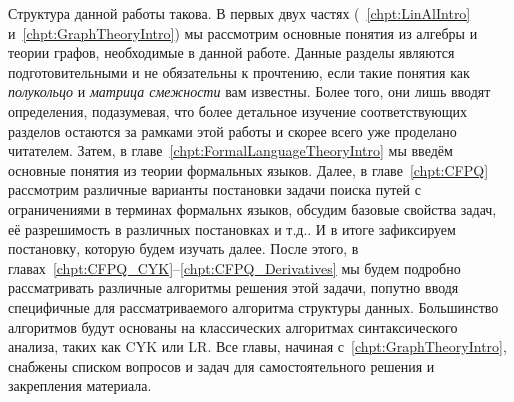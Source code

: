Структура данной работы такова.
В первых двух частях (~\ref{chpt:LinAlIntro} и~\ref{chpt:GraphTheoryIntro}) мы рассмотрим основные понятия из алгебры и теории графов, необходимые в данной работе. Данные разделы являются подготовительными и не обязательны к прочтению, если такие понятия как \textit{полукольцо} и \textit{матрица смежности} вам известны. Более того, они лишь вводят определения, подазумевая, что более детальное изучение соответствующих разделов остаются за рамками этой работы и скорее всего уже проделано читателем.
Затем, в главе~\ref{chpt:FormalLanguageTheoryIntro} мы введём основные понятия из теории формальных языков.
Далее, в главе~\ref{chpt:CFPQ} рассмотрим различные варианты постановки задачи поиска путей с ограничениями в терминах формальнх языков, обсудим базовые свойства задач, её разрешимость в различных постановках и т.д..
И в итоге зафиксируем постановку, которую будем изучать далее.
После этого, в главах~\ref{chpt:CFPQ_CYK}--\ref{chpt:CFPQ_Derivatives} мы будем подробно рассматривать различные алгоритмы решения этой задачи, попутно вводя специфичные для рассматриваемого алгоритма структуры данных.
Большинство алгоритмов будут основаны на классических алгоритмах синтаксического анализа, таких как CYK или LR.
Все главы, начиная с~\ref{chpt:GraphTheoryIntro}, снабжены списком вопросов и задач для самостоятельного решения и закрепления материала.